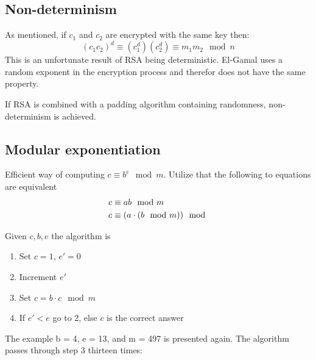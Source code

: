 \subsection{Non-determinism}
As mentioned, if $c_1$ and $c_2$ are encrypted with the same key then:
\begin{equation}
  (c_1c_2)^d \equiv (c_1^d) (c_2^d) \equiv m_1m_2 \mod n
\end{equation}
This is an unfortunate result of RSA being deterministic. El-Gamal
uses a random exponent in the encryption process and therefor does not
have the same property.

If RSA is combined with a padding algorithm containing randomness,
non-determinism is achieved.

\subsection{Modular exponentiation}

Efficient way of computing $c \equiv b^e \mod m$. Utilize that the following
to equations are equivalent
\begin{align*}
  c &\equiv ab \mod m\\
  c &\equiv (a \cdot (b \mod m)) \mod
\end{align*}

Given $c, b, e$ the algorithm is
\begin{enumerate}
\item Set $c = 1$, $e' = 0$
\item Increment $e'$
\item Set $c = b \cdot c \mod m$
\item If $e' < e$ go to 2, else $c$ is the correct answer
\end{enumerate}

The example b = 4, e = 13, and m = 497 is presented again. The algorithm passes through step 3 thirteen times:

